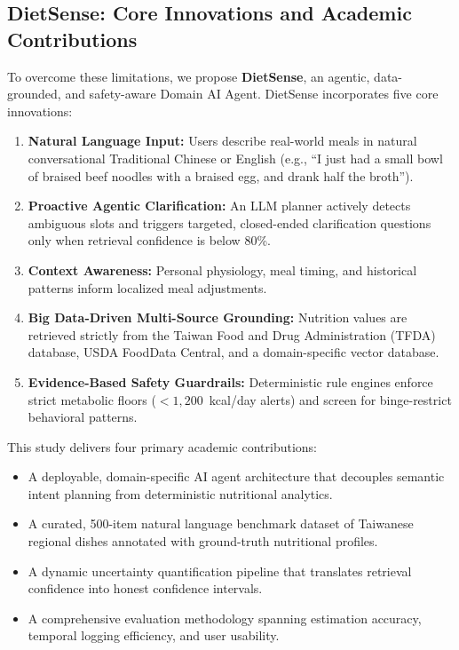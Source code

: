 \documentclass[conference]{IEEEtran}
\begin{document}
\subsection{DietSense: Core Innovations and Academic Contributions}
To overcome these limitations, we propose \textbf{DietSense}, an agentic, data-grounded, and safety-aware Domain AI Agent. DietSense incorporates five core innovations:
\begin{enumerate}
    \item \textbf{Natural Language Input:} Users describe real-world meals in natural conversational Traditional Chinese or English (e.g., ``I just had a small bowl of braised beef noodles with a braised egg, and drank half the broth'').
    \item \textbf{Proactive Agentic Clarification:} An LLM planner actively detects ambiguous slots and triggers targeted, closed-ended clarification questions only when retrieval confidence is below 80\%.
    \item \textbf{Context Awareness:} Personal physiology, meal timing, and historical patterns inform localized meal adjustments.
    \item \textbf{Big Data-Driven Multi-Source Grounding:} Nutrition values are retrieved strictly from the Taiwan Food and Drug Administration (TFDA) database, USDA FoodData Central, and a domain-specific vector database.
    \item \textbf{Evidence-Based Safety Guardrails:} Deterministic rule engines enforce strict metabolic floors ($<1,200$~kcal/day alerts) and screen for binge-restrict behavioral patterns.
\end{enumerate}

This study delivers four primary academic contributions:
\begin{itemize}
    \item A deployable, domain-specific AI agent architecture that decouples semantic intent planning from deterministic nutritional analytics.
    \item A curated, 500-item natural language benchmark dataset of Taiwanese regional dishes annotated with ground-truth nutritional profiles.
    \item A dynamic uncertainty quantification pipeline that translates retrieval confidence into honest confidence intervals.
    \item A comprehensive evaluation methodology spanning estimation accuracy, temporal logging efficiency, and user usability.
\end{itemize}
\end{document}
